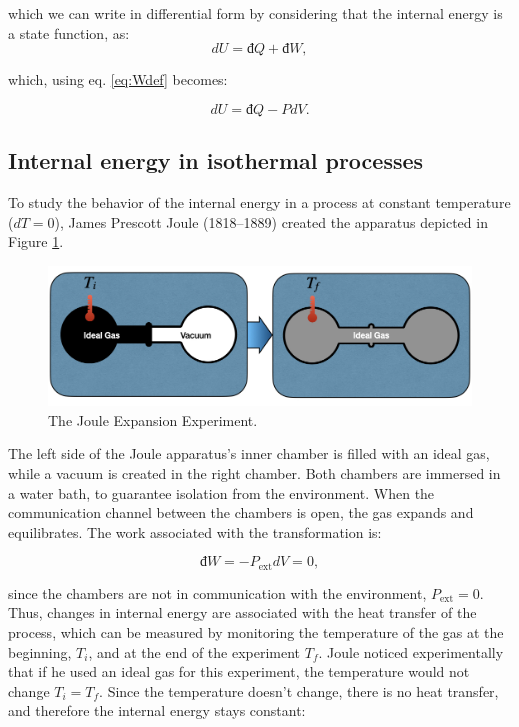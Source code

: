 \documentclass[
  9pt,
]{extbook}
\theoremstyle{definition}
\theoremstyle{definition}
\theoremstyle{definition}
\theoremstyle{remark}
\begin{document}
which we can write in differential form by considering that the internal energy is a state function, as:
\begin{equation}
  dU = đ Q + đ W,
  \label{eq:dU}
\end{equation}

which, using eq. \eqref{eq:Wdef} becomes:

\begin{equation}
  dU = đ Q - PdV.
  \label{eq:dUpdv}
\end{equation}

\hypertarget{isothermalE}{%
\subsection{Internal energy in isothermal processes}\label{isothermalE}}

To study the behavior of the internal energy in a process at constant temperature (\(dT=0\)), James Prescott Joule (1818--1889) created the apparatus depicted in Figure \ref{fig:FigJexp}.

\begin{figure}

{\centering \includegraphics[width=0.8\linewidth]{./img/OEP_Figures.006} 

}

\caption{The Joule Expansion Experiment.}\label{fig:FigJexp}
\end{figure}

The left side of the Joule apparatus's inner chamber is filled with an ideal gas, while a vacuum is created in the right chamber. Both chambers are immersed in a water bath, to guarantee isolation from the environment. When the communication channel between the chambers is open, the gas expands and equilibrates. The work associated with the transformation is:

\begin{equation}
  đ W=-P_{\text{ext}}dV = 0,
  \label{eq:JexpW}
\end{equation}

since the chambers are not in communication with the environment, \(P_{\text{ext}}=0\). Thus, changes in internal energy are associated with the heat transfer of the process, which can be measured by monitoring the temperature of the gas at the beginning, \(T_i\), and at the end of the experiment \(T_f\). Joule noticed experimentally that if he used an ideal gas for this experiment, the temperature would not change \(T_i = T_f\). Since the temperature doesn't change, there is no heat transfer, and therefore the internal energy stays constant:
\end{document}
